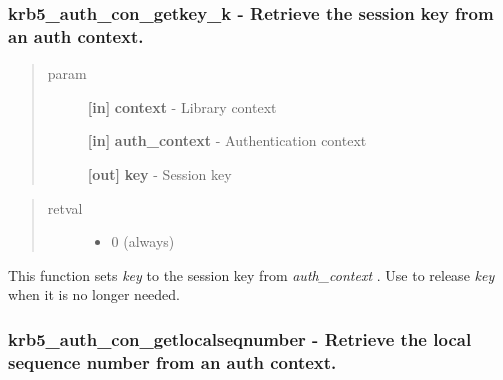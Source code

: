 \documentclass[letterpaper,10pt,english]{sphinxmanual}
\begin{document}
\subsubsection{krb5\_auth\_con\_getkey\_k -  Retrieve the session key from an auth context.}
\label{appdev/refs/api/krb5_auth_con_getkey_k:krb5-auth-con-getkey-k-retrieve-the-session-key-from-an-auth-context}\label{appdev/refs/api/krb5_auth_con_getkey_k::doc}

\begin{fulllineitems}
\label{appdev/refs/api/krb5_auth_con_getkey_k:krb5_auth_con_getkey_k}
\end{fulllineitems}

\begin{quote}\begin{description}
\item[{param}] \leavevmode
\textbf{{[}in{]}} \textbf{context} - Library context

\textbf{{[}in{]}} \textbf{auth\_context} - Authentication context

\textbf{{[}out{]}} \textbf{key} - Session key

\end{description}\end{quote}
\begin{quote}\begin{description}
\item[{retval}] \leavevmode\begin{itemize}
\item {} 
0   (always)

\end{itemize}

\end{description}\end{quote}

This function sets \emph{key} to the session key from \emph{auth\_context} . Use {\hyperref[appdev/refs/api/krb5_k_free_key:krb5_k_free_key]{}} to release \emph{key} when it is no longer needed.


\subsubsection{krb5\_auth\_con\_getlocalseqnumber -  Retrieve the local sequence number from an auth context.}
\label{appdev/refs/api/krb5_auth_con_getlocalseqnumber::doc}\label{appdev/refs/api/krb5_auth_con_getlocalseqnumber:krb5-auth-con-getlocalseqnumber-retrieve-the-local-sequence-number-from-an-auth-context}
\end{document}
